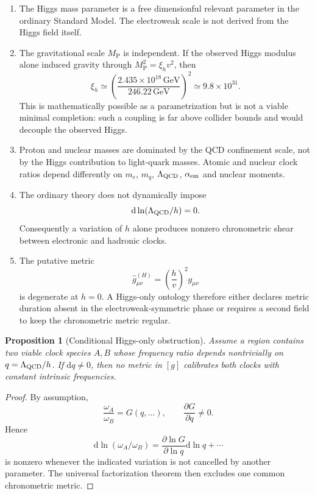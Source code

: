 \documentclass[11pt,a4paper]{article}
\newtheorem{proposition}[definition]{Proposition}
\newcommand{\dd}{\mathrm{d}}
\newcommand{\MP}{M_{\mathrm P}}
\begin{document}
\begin{enumerate}
  \item The Higgs mass parameter is a free dimensionful relevant parameter in the ordinary Standard Model. The electroweak scale is not derived from the Higgs field itself.
  \item The gravitational scale $\MP$ is independent. If the observed Higgs modulus alone induced gravity through $\MP^2=\xi_hv^2$, then
  \[
    \xi_h\simeq\left(\frac{2.435\times10^{18}\,\mathrm{GeV}}{246.22\,\mathrm{GeV}}\right)^2
    \simeq9.8\times10^{31}.
  \]
  This is mathematically possible as a parametrization but is not a viable minimal completion: such a coupling is far above collider bounds and would decouple the observed Higgs. \cite{Atkins2012}
  \item Proton and nuclear masses are dominated by the QCD confinement scale, not by the Higgs contribution to light-quark masses. Atomic and nuclear clock ratios depend differently on $m_e$, $m_q$, $\Lambda_{\rm QCD}$, $\alpha_{\rm em}$ and nuclear moments. \cite{Sherrill2023,Kawasaki2025}
  \item The ordinary theory does not dynamically impose
  \[
    \dd\ln(\Lambda_{\rm QCD}/h)=0.
  \]
  Consequently a variation of $h$ alone produces nonzero chronometric shear between electronic and hadronic clocks.
  \item The putative metric
  \[
    \widehat g^{(H)}_{\mu\nu}=\left(\frac{h}{v}\right)^2g_{\mu\nu}
  \]
  is degenerate at $h=0$. A Higgs-only ontology therefore either declares metric duration absent in the electroweak-symmetric phase or requires a second field to keep the chronometric metric regular.
\end{enumerate}

\begin{proposition}[Conditional Higgs-only obstruction]
Assume a region contains two viable clock species $A,B$ whose frequency ratio depends nontrivially on $q=\Lambda_{\rm QCD}/h$. If $\dd q\neq0$, then no metric in $[g]$ calibrates both clocks with constant intrinsic frequencies.
\end{proposition}

\begin{proof}
By assumption,
\[
 \frac{\omega_A}{\omega_B}=G(q,\ldots),
 \qquad
 \frac{\partial G}{\partial q}\neq0.
\]
Hence
\[
 \dd\ln(\omega_A/\omega_B)
 =\frac{\partial\ln G}{\partial\ln q}\dd\ln q+\cdots
\]
is nonzero whenever the indicated variation is not cancelled by another parameter. The universal factorization theorem then excludes one common chronometric metric.
\end{proof}
\end{document}
